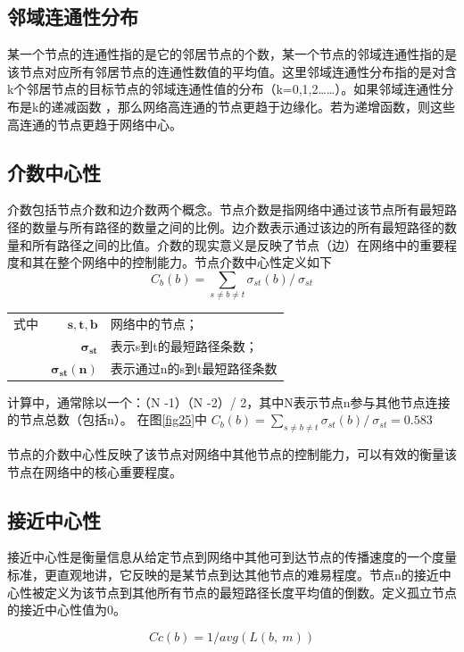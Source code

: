 \subsection{邻域连通性分布}
某一个节点的连通性指的是它的邻居节点的个数，某一个节点的邻域连通性指的是该节点对应所有邻居节点的连通性数值的平均值。这里邻域连通性分布指的是对含k个邻居节点的目标节点的邻域连通性值的分布（k=0,1,2……）。如果邻域连通性分布是k的递减函数 ，那么网络高连通的节点更趋于边缘化。若为递增函数，则这些高连通的节点更趋于网络中心。
\subsection{介数中心性}
介数包括节点介数和边介数两个概念。节点介数是指网络中通过该节点所有最短路径的数量与所有路径的数量之间的比例。边介数表示通过该边的所有最短路径的数量和所有路径之间的比值。介数的现实意义是反映了节点（边）在网络中的重要程度和其在整个网络中的控制能力。节点介数中心性定义如下
\begin{equation}\label{eq26}
	C_{b}( b) =\sum\limits _{s\neq b\neq t} \sigma_{st}( b) /\ \sigma_{st}
\end{equation}

\begin{tabularx}{\textwidth}{@{}l@{\quad}r@{———}X@{}}
式中 & $\boldsymbol{s,t,b}$ &  网络中的节点；\\
	& $\boldsymbol{ \sigma_{st}}$ &   表示s到t的最短路径条数；\\
	& $\boldsymbol{\sigma_{st}( n)}$ &	表示通过n的s到t最短路径条数 \\
\end{tabularx}\vspace{3.15bp}
计算中，通常除以一个：（N -1）（N -2）/ 2，其中N表示节点n参与其他节点连接的节点总数（包括n）。
在图\ref{fig25}中 $C_{b}( b) =\sum\limits _{s\neq b\neq t} \sigma_{st}( b) /\ \sigma_{st} =  0.583$

节点的介数中心性反映了该节点对网络中其他节点的控制能力，可以有效的衡量该节点在网络中的核心重要程度。
\subsection{接近中心性}
接近中心性是衡量信息从给定节点到网络中其他可到达节点的传播速度的一个度量标准，更直观地讲，它反映的是某节点到达其他节点的难易程度。节点n的接近中心性被定义为该节点到其他所有节点的最短路径长度平均值的倒数。定义孤立节点的接近中心性值为0。

\begin{equation}\label{eq27}
	Cc( b) =1/avg( L( b,\ m))
\end{equation}

